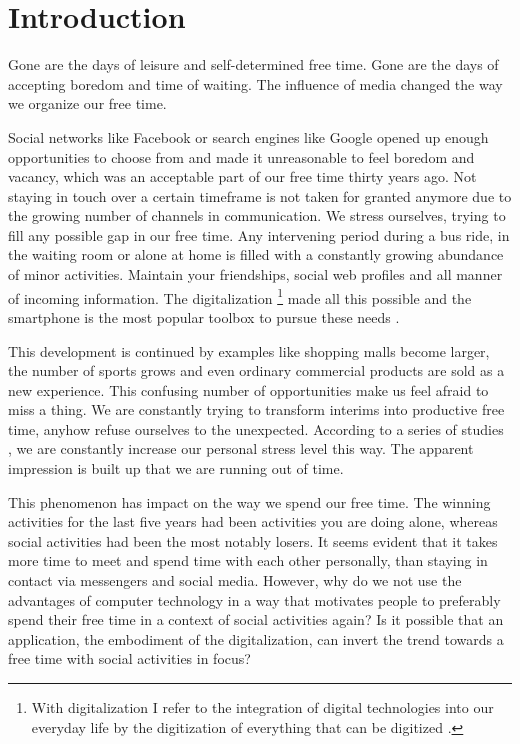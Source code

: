 \documentclass[12pt,numbers=noenddot,parskip,bibliography=totocnumbered,listof=totocnumbered,draft]{scrreprt}
\begin{document}
\chapter{Introduction}
Gone are the days of leisure and self-determined free time. Gone are the days of accepting boredom and time of waiting. The influence of media changed the way we organize our free time.

Social networks like Facebook or search engines like Google opened up enough opportunities to choose from and made it unreasonable to feel boredom and vacancy, which was an acceptable part of our free time thirty years ago. Not staying in touch over a certain timeframe is not taken for granted anymore due to the growing number of channels in communication. We stress ourselves, trying to fill any possible gap in our free time. Any intervening period during a bus ride, in the waiting room or alone at home is filled with a constantly growing abundance of minor activities. Maintain your friendships, social web profiles and all manner of incoming information. The digitalization \footnote{With digitalization I refer to the integration of digital technologies into our everyday life by the digitization of everything that can be digitized \citep{digitalization}.} made all this possible and the smartphone is the most popular toolbox to pursue these needs \citep[p.213]{destatis2017}.

This development is continued by examples like shopping malls become larger, the number of sports grows and even ordinary commercial products are sold as a new experience. This confusing number of opportunities make us feel afraid to miss a thing. We are constantly trying to transform interims into productive free time, anyhow refuse ourselves to the unexpected. According to a series of studies \citep[p. 14]{freizeitmonitor2016}, we are constantly increase our personal stress level this way. The apparent impression is built up that we are running out of time.

This phenomenon has impact on the way we spend our free time. The winning activities for the last five years had been activities you are doing alone, whereas social activities had been the most notably losers. It seems evident that it takes more time to meet and spend time with each other personally, than staying in contact via messengers and social media. However, why do we not use the advantages of computer technology in a way that motivates people to preferably spend their free time in a context of social activities again? Is it possible that an application, the embodiment of the digitalization, can invert the trend towards a free time with social activities in focus?
\end{document}
